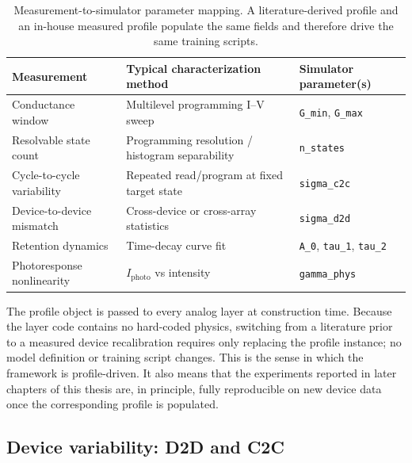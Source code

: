 \begin{table}[htbp]
\centering
\caption{Measurement-to-simulator parameter mapping. A literature-derived profile and an in-house measured profile populate the same fields and therefore drive the same training scripts.}
\label{tab:measurement-mapping}
\begin{tabular}{lll}
\toprule
\textbf{Measurement} & \textbf{Typical characterization method} & \textbf{Simulator parameter(s)} \\
\midrule
Conductance window & Multilevel programming I--V sweep & \texttt{G\_min}, \texttt{G\_max} \\
Resolvable state count & Programming resolution / histogram separability & \texttt{n\_states} \\
Cycle-to-cycle variability & Repeated read/program at fixed target state & \texttt{sigma\_c2c} \\
Device-to-device mismatch & Cross-device or cross-array statistics & \texttt{sigma\_d2d} \\
Retention dynamics & Time-decay curve fit & \texttt{A\_0}, \texttt{tau\_1}, \texttt{tau\_2} \\
Photoresponse nonlinearity & $I_{\text{photo}}$ vs intensity & \texttt{gamma\_phys} \\
\bottomrule
\end{tabular}
\end{table}

The profile object is passed to every analog layer at construction time. Because the layer code contains no hard-coded physics, switching from a literature prior to a measured device recalibration requires only replacing the profile instance; no model definition or training script changes. This is the sense in which the framework is profile-driven. It also means that the experiments reported in later chapters of this thesis are, in principle, fully reproducible on new device data once the corresponding profile is populated.

\subsection{Device variability: D2D and C2C}
\label{subsec:d2d-c2c-interface}

